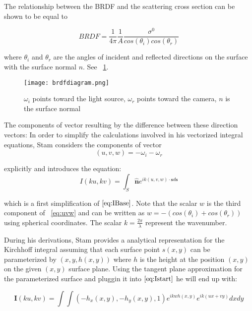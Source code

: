 The relationship between the BRDF and the scattering cross section can be shown to be equal to 

\begin{equation}
 BRDF = \frac{1}{4\pi}\frac{1}{A}\frac{\sigma^0}{cos(\theta_i)cos(\theta_r)}
 \label{fig:crossscateringbrdfrelationship} 
\end{equation}

where $\theta_i$ and $\theta_r$ are the angles of incident and reflected directions on the surface with the surface normal $n$. See ~\ref{fig:geometricsetup}.

\begin{figure}[ht]
  \centering
  \texttt{[image: brdfdiagram.png]}
  \caption{$\omega_i$ points toward the light source, $\omega_r$ points toward the camera, $n$ is the surface normal}
  \label{fig:geometricsetup}  
\end{figure}

The components of vector resulting by the difference between these direction vectors:
In order to simplify the calculations involved in his vectorized integral equations, Stam considers the components of vector 
\begin{equation}
  (u,v,w) = -\omega_i - \omega_r 
\label{eq:uvw}
\end{equation}

explicitly and introduces the equation: 
\begin{equation}
  I(ku,kv) = \int_{S} \hat{\mathbf{n}} e^{ik(u,v,w) \cdot \mathbf{s} d\mathbf{s}} 
\label{eq:Istart}
\end{equation}

which is a first simplification of $\ref{eq:IBase}$. Note that the scalar $w$ is the third component of ~\ref{eq:uvw} and can be written as $w = -(cos(\theta_i)+cos(\theta_r))$ using spherical coordinates. The scalar $k=\frac{2\pi}{\lambda}$ represent the wavenumber.


During his derivations, Stam provides a analytical representation for the Kirchhoff integral assuming that each surface point $s(x,y)$ can be parameterized by $(x,y,h(x,y))$ where $h$ is the height at the position $(x,y)$ on the given $(x,y)$ surface plane. Using the tangent plane approximation for the parameterized surface and pluggin it into $\ref{eq:Istart}$ he will end up with: 

\begin{equation}
    \mathbf{I}(ku, kv) = \int \int (-h_{x}(x,y), -h_{y}(x,y), 1) e^{ikwh(x,y)} e^{ik(ux + vy)} dx dy
\label{eq:I1}
\end{equation}


